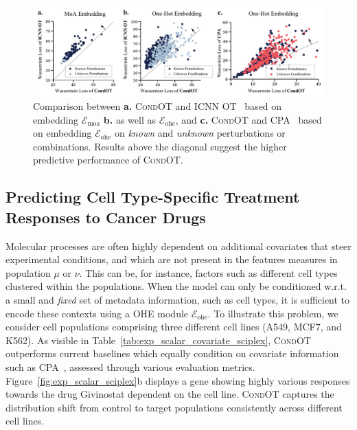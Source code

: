 
\begin{figure}[t]
    \includegraphics[width=\textwidth]{figures/fig_action_comb_comparison_scatter.pdf}
    \caption{Comparison between \textbf{a.} \textsc{CondOT} and \textsc{ICNN OT}~\citep{makkuva2020optimal} based on embedding $\mathcal{E}_\text{moa}$ \textbf{b.} as well as $\mathcal{E}_\text{ohe}$, and \textbf{c.} \textsc{CondOT} and \textsc{CPA}~\citep{lotfollahi2021compositional} based on embedding $\mathcal{E}_\text{ohe}$ on \emph{known} and \emph{unknown} perturbations or combinations. Results above the diagonal suggest the higher predictive performance of \textsc{CondOT}.}
    \label{fig:exp_action_norman_scatter}
\end{figure}


\subsection{Predicting Cell Type-Specific Treatment Responses to Cancer Drugs} \label{sec:eval_covariate}

 Molecular processes are often highly dependent on additional covariates that steer experimental conditions, and which are not present in the features measures in population $\mu$ or $\nu$.
This can be, for instance, factors such as different cell types clustered within the populations.
When the model can only be conditioned w.r.t. a small and \textit{fixed} set of metadata information, such as cell types, it is sufficient to encode these contexts using a \acrshort{OHE} module $\mathcal{E}_\text{ohe}$.
To illustrate this problem, we consider cell populations comprising three different cell lines (A549, MCF7, and K562). As visible in Table~\ref{tab:exp_scalar_covariate_sciplex}, \textsc{CondOT} outperforms current baselines which equally condition on covariate information such as \textsc{CPA}~\citep{lotfollahi2021compositional}, assessed through various evaluation metrics.
Figure~\ref{fig:exp_scalar_sciplex}b displays a gene showing highly various responses towards the drug Givinostat dependent on the cell line. \textsc{CondOT} captures the distribution shift from control to target populations consistently across different cell lines.

